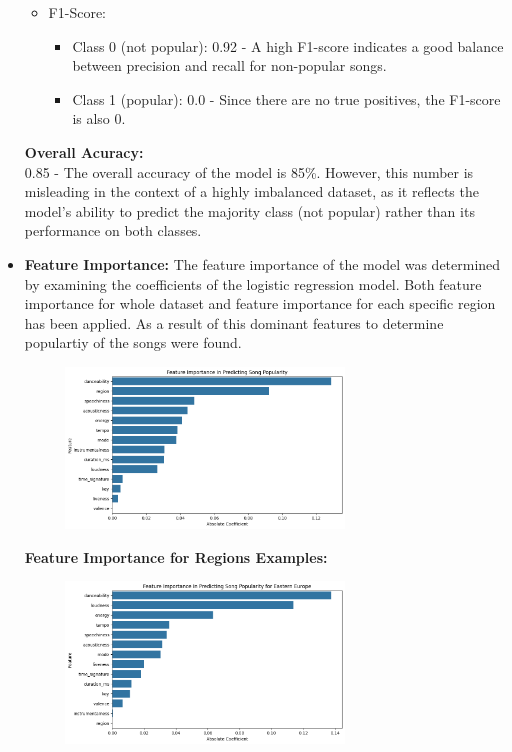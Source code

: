 \begin{itemize}
\begin{itemize}
\begin{itemize}
                \end{itemize}
            \item F1-Score:
                \begin{itemize}
                    \item Class 0 (not popular): 0.92 - A high F1-score indicates a good balance between precision and recall for non-popular songs.
                    \item Class 1 (popular): 0.0 - Since there are no true positives, the F1-score is also 0.
                \end{itemize}
        \end{itemize}
        \textbf{Overall Acuracy: } 
        \\
        0.85 - The overall accuracy of the model is 85\%. However, this number is misleading in the context of a highly imbalanced dataset, as it reflects the model's ability to predict the majority class (not popular) rather than its performance on both classes.
    \item \textbf{Feature Importance: } The feature importance of the model was determined by examining the coefficients of the logistic regression model. Both feature importance for whole dataset and feature importance for each specific region has been applied. As a result of this dominant features to determine populartiy of the songs were found.
        \begin{figure}[h] 
            \centering 
            \includegraphics[width=0.7\textwidth]{media/logistic_reg_feature_imp.png} 
        \end{figure}
        \textbf{Feature Importance for Regions Examples: }
        \begin{figure}[h] 
            \centering 
            \includegraphics[width=0.7\textwidth]{media/log_reg_feature_selection_eastern_europe.png} 

\end{figure}
\end{itemize}
